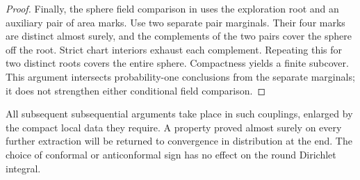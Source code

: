 \begin{proof}
Finally, the sphere field comparison in \cite[Lemma~18.1]{P} uses the
exploration root and an auxiliary pair of area marks.  Use two separate
pair marginals.  Their four marks are distinct almost surely, and the
complements of the two pairs cover the sphere off the root.  Strict chart
interiors exhaust each complement.  Repeating this for two distinct roots
covers the entire sphere.  Compactness yields a finite subcover.  This
argument intersects probability-one conclusions from the separate
marginals; it does not strengthen either conditional field comparison.
\end{proof}

All subsequent subsequential arguments take place in such couplings, enlarged
by the compact local data they require.  A property proved almost surely on
every further extraction will be returned to convergence in distribution at
the end.  The choice of conformal or anticonformal sign has no effect on the
round Dirichlet integral.
